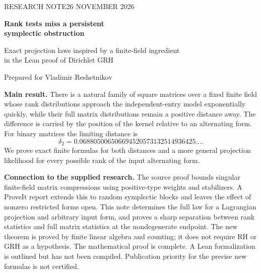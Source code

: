 \documentclass[11pt]{article}
\newcommand{\1}{\mathbf 1}
\theoremstyle{definition}
\theoremstyle{remark}
\numberwithin{equation}{section}
\begin{document}
\hypersetup{pageanchor=false}
\begin{titlepage}
\color{ink}
{\sffamily\small RESEARCH NOTE\hfill 26 NOVEMBER 2026\par}
\vspace{22mm}
{\sffamily\bfseries\fontsize{29}{34}\selectfont Rank tests miss a persistent\\symplectic obstruction\par}
\vspace{8mm}
{\sffamily\Large Exact projection laws inspired by a finite-field ingredient\\in the Lean proof of Dirichlet GRH\par}
\vspace{13mm}
{\large Prepared for Vladimir Reshetnikov\par}
\vspace{14mm}
\noindent\begin{minipage}{.94\textwidth}
\textbf{Main result.} There is a natural family of square matrices over a fixed finite field whose rank distributions approach the independent-entry model exponentially quickly, while their full matrix distributions remain a positive distance away. The difference is carried by the position of the kernel relative to an alternating form. For binary matrices the limiting distance is
\[
\delta_2=0.068805006506694520573132514936425\ldots.
\]
We prove exact finite formulas for both distances and a more general projection likelihood for every possible rank of the input alternating form.
\end{minipage}
\vfill
\noindent\textbf{Connection to the supplied research.} The source proof bounds singular finite-field matrix compressions using positive-type weights and stabilizers. A ProveIt report extends this to random symplectic blocks and leaves the effect of nonzero restricted forms open. This note determines the full law for a Lagrangian projection and arbitrary input form, and proves a sharp separation between rank statistics and full matrix statistics at the nondegenerate endpoint.
\vspace{7mm}
\noindent\small The new theorem is proved by finite linear algebra and counting; it does not require RH or GRH as a hypothesis. The mathematical proof is complete. A Lean formalization is outlined but has not been compiled. Publication priority for the precise new formulas is not certified.
\end{titlepage}
\hypersetup{pageanchor=true}
\end{document}
